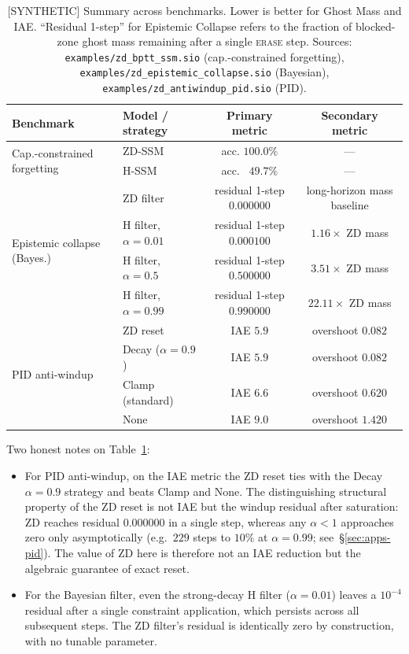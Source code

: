 \documentclass{article}
\begin{document}
\begin{table}[h]
  \centering
  \caption{[SYNTHETIC] Summary across benchmarks. Lower is better for Ghost Mass and IAE.
  ``Residual 1-step'' for Epistemic Collapse refers to the fraction of
  blocked-zone ghost mass remaining after a single \textsc{erase} step.
  Sources: \texttt{examples/zd\_bptt\_ssm.sio} (cap.-constrained forgetting),
  \texttt{examples/zd\_epistemic\_collapse.sio} (Bayesian),
  \texttt{examples/zd\_antiwindup\_pid.sio} (PID).}
  \label{tab:aggregate}
  \begin{tabular}{llcc}
    \toprule
    Benchmark & Model / strategy & Primary metric & Secondary metric \\
    \midrule
    \multirow{2}{*}{Cap.-constrained forgetting}
      & ZD-SSM & acc. $\mathbf{100.0\%}$ & --- \\
      & H-SSM & acc. $\phantom{0}49.7\%$ & --- \\
    \midrule
    \multirow{4}{*}{Epistemic collapse (Bayes.)}
      & ZD filter & residual 1-step $\mathbf{0.000000}$ & long-horizon mass baseline \\
      & H filter, $\alpha{=}0.01$ & residual 1-step $0.000100$ & $1.16\times$ ZD mass \\
      & H filter, $\alpha{=}0.5$  & residual 1-step $0.500000$ & $3.51\times$ ZD mass \\
      & H filter, $\alpha{=}0.99$ & residual 1-step $0.990000$ & $22.11\times$ ZD mass \\
    \midrule
    \multirow{4}{*}{PID anti-windup}
      & ZD reset & IAE $\mathbf{5.9}$ & overshoot $0.082$ \\
      & Decay ($\alpha{=}0.9$) & IAE $5.9$ & overshoot $0.082$ \\
      & Clamp (standard) & IAE $6.6$ & overshoot $0.620$ \\
      & None & IAE $9.0$ & overshoot $1.420$ \\
    \bottomrule
  \end{tabular}
\end{table}

Two honest notes on Table~\ref{tab:aggregate}:

\begin{itemize}
  \item For PID anti-windup, on the IAE metric the ZD reset ties with the
  Decay~$\alpha=0.9$ strategy and beats Clamp and None. The distinguishing
  structural property of the ZD reset is not IAE but the windup residual after
  saturation: ZD reaches residual $0.000000$ in a single step, whereas any
  $\alpha<1$ approaches zero only asymptotically (e.g.\ $229$ steps to $10\%$
  at $\alpha = 0.99$; see~\S\ref{sec:apps-pid}). The value of ZD here is
  therefore not an IAE reduction but the algebraic guarantee of exact reset.
  \item For the Bayesian filter, even the strong-decay H filter
  ($\alpha = 0.01$) leaves a $10^{-4}$ residual after a single constraint
  application, which persists across all subsequent steps. The ZD filter's
  residual is identically zero by construction, with no tunable parameter.
\end{itemize}
\end{document}

